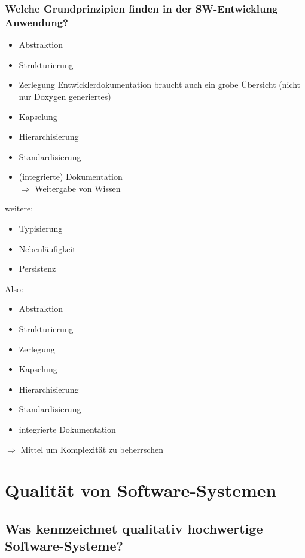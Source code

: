 \subsection{Welche Grundprinzipien finden in der SW-Entwicklung Anwendung?}
\begin{itemize}
\item Abstraktion
\item Strukturierung
\item Zerlegung
Entwicklerdokumentation braucht auch ein grobe Übersicht (nicht nur Doxygen generiertes)
\item Kapselung
\item Hierarchisierung
\item Standardisierung
\item (integrierte) Dokumentation\\
$\Rightarrow$ Weitergabe von Wissen
\end{itemize}
weitere:
\begin{itemize}
\item Typisierung
\item Nebenläufigkeit
\item Persistenz
\end{itemize}
Also: 
\begin{itemize}
\item Abstraktion 
\item Strukturierung
\item Zerlegung
\item Kapselung
\item Hierarchisierung
\item Standardisierung
\item integrierte Dokumentation
\end{itemize}
$\Rightarrow$ Mittel um Komplexität zu beherrschen

\chapter{Qualität von Software-Systemen}
\section{Was kennzeichnet qualitativ hochwertige Software-Systeme?}
